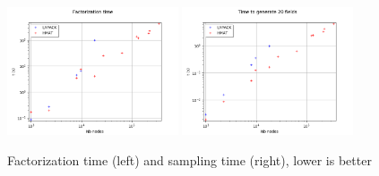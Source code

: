 \documentclass{beamer}
\begin{document}
\begin{frame}
\begin{figure}
\begin{center}
\includegraphics[width=0.45\textwidth]{figures/Factorization.png}%
\includegraphics[width=0.45\textwidth]{figures/Sampling.png}
\end{center}
\caption{Factorization time (left) and sampling time (right), lower is better}
\end{figure}

\end{frame}
\end{document}
